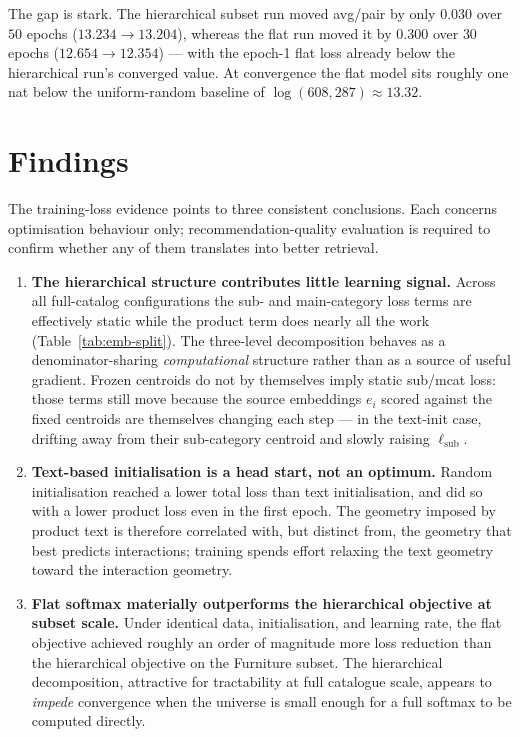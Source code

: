 The gap is stark. The hierarchical subset run moved avg/pair by only $0.030$
over $50$ epochs ($13.234\to 13.204$), whereas the flat run moved it by $0.300$
over $30$ epochs ($12.654\to 12.354$) --- with the epoch-1 flat loss already
below the hierarchical run's converged value. At convergence the flat model
sits roughly one nat below the uniform-random baseline of
$\log(608{,}287)\approx 13.32$.

\section{Findings}
\label{sec:emb-findings}

The training-loss evidence points to three consistent conclusions. Each
concerns optimisation behaviour only; recommendation-quality evaluation is
required to confirm whether any of them translates into better retrieval.

\begin{enumerate}
  \item \textbf{The hierarchical structure contributes little learning signal.}
        Across all full-catalog configurations the sub- and main-category loss
        terms are effectively static while the product term does nearly all the
        work (Table~\ref{tab:emb-split}). The three-level decomposition behaves
        as a denominator-sharing \emph{computational} structure rather than as a
        source of useful gradient. Frozen centroids do not by themselves imply
        static sub/mcat loss: those terms still move because the source
        embeddings $e_i$ scored against the fixed centroids are themselves
        changing each step --- in the text-init case, drifting away from their
        sub-category centroid and slowly raising $\ell_{\text{sub}}$.
  \item \textbf{Text-based initialisation is a head start, not an optimum.}
        Random initialisation reached a lower total loss than text
        initialisation, and did so with a lower product loss even in the first
        epoch. The geometry imposed by product text is therefore correlated
        with, but distinct from, the geometry that best predicts interactions;
        training spends effort relaxing the text geometry toward the interaction
        geometry.
  \item \textbf{Flat softmax materially outperforms the hierarchical objective
        at subset scale.} Under identical data, initialisation, and learning
        rate, the flat objective achieved roughly an order of magnitude more
        loss reduction than the hierarchical objective on the Furniture subset.
        The hierarchical decomposition, attractive for tractability at full
        catalogue scale, appears to \emph{impede} convergence when the universe
        is small enough for a full softmax to be computed directly.
\end{enumerate}

